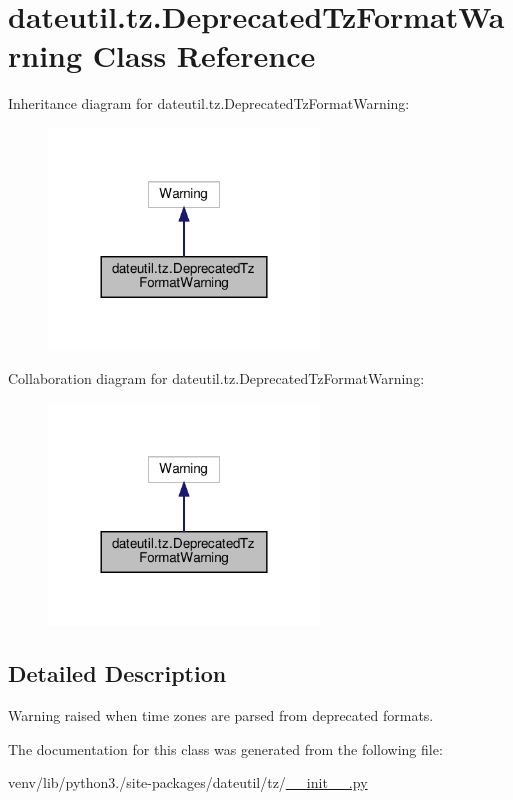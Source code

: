 \hypertarget{classdateutil_1_1tz_1_1DeprecatedTzFormatWarning}{}\section{dateutil.\+tz.\+Deprecated\+Tz\+Format\+Warning Class Reference}
\label{classdateutil_1_1tz_1_1DeprecatedTzFormatWarning}


Inheritance diagram for dateutil.\+tz.\+Deprecated\+Tz\+Format\+Warning\+:
\nopagebreak
\begin{figure}[H]
\begin{center}
\leavevmode
\includegraphics[width=204pt]{classdateutil_1_1tz_1_1DeprecatedTzFormatWarning__inherit__graph}
\end{center}
\end{figure}


Collaboration diagram for dateutil.\+tz.\+Deprecated\+Tz\+Format\+Warning\+:
\nopagebreak
\begin{figure}[H]
\begin{center}
\leavevmode
\includegraphics[width=204pt]{classdateutil_1_1tz_1_1DeprecatedTzFormatWarning__coll__graph}
\end{center}
\end{figure}


\subsection{Detailed Description}
\begin{DoxyVerb}Warning raised when time zones are parsed from deprecated formats.\end{DoxyVerb}
 

The documentation for this class was generated from the following file\+:\begin{DoxyCompactItemize}
\item 
venv/lib/python3./site-\/packages/dateutil/tz/\hyperlink{venv_2lib_2python3_89_2site-packages_2dateutil_2tz_2____init_____8py}{\+\_\+\+\_\+init\+\_\+\+\_\+.\+py}\end{DoxyCompactItemize}

